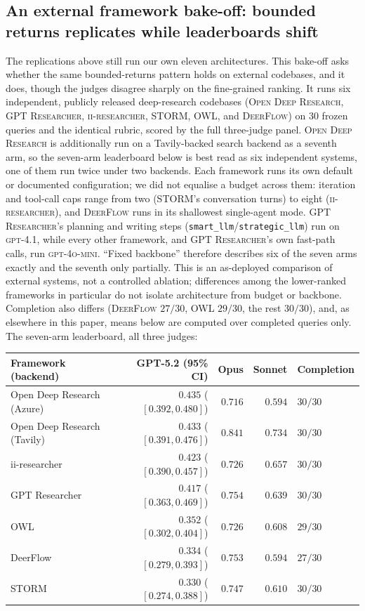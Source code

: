 \documentclass[11pt]{article}
\begin{document}
\subsection{An external framework bake-off: bounded returns replicates while leaderboards shift}\label{sec:bakeoff}
The replications above still run our own eleven architectures. This bake-off asks whether
the same bounded-returns pattern holds on external codebases, and it does,
though the judges disagree sharply on the fine-grained ranking.
It runs six independent, publicly released deep-research codebases (\textsc{Open Deep
Research}, \textsc{GPT Researcher}, \textsc{ii-researcher}, \textsc{STORM},
\textsc{OWL}, and \textsc{DeerFlow}) on $30$ frozen queries and the identical rubric,
scored by the full three-judge panel. \textsc{Open Deep Research} is additionally run on
a Tavily-backed search backend as a seventh arm, so the seven-arm leaderboard below is
best read as six independent systems, one of them run twice under two backends. Each framework runs its own default or
documented configuration; we did not equalise a budget across them: iteration and
tool-call caps range from two (\textsc{STORM}'s conversation turns) to eight
(\textsc{ii-researcher}), and \textsc{DeerFlow} runs in its shallowest single-agent
mode. \textsc{GPT Researcher}'s planning and writing steps
(\texttt{smart\_llm}/\texttt{strategic\_llm}) run on \textsc{gpt-4.1}, while every other
framework, and \textsc{GPT Researcher}'s own fast-path calls, run \textsc{gpt-4o-mini}.
``Fixed backbone'' therefore describes six of the seven arms exactly and the seventh
only partially. This is an as-deployed comparison of external systems, not a controlled
ablation; differences among the lower-ranked frameworks in particular do not isolate
architecture from budget or backbone. Completion also differs
(\textsc{DeerFlow} $27/30$, \textsc{OWL} $29/30$, the rest $30/30$), and, as elsewhere
in this paper, means below are computed over completed queries only. The seven-arm
leaderboard, all three judges:
\begin{center}
\small
\begin{tabular}{lrrrl}
\toprule
Framework (backend) & GPT-5.2 (95\% CI) & Opus & Sonnet & Completion \\
\midrule
Open Deep Research (Azure) & $0.435$ ($[0.392, 0.480]$) & $0.716$ & $0.594$ & $30/30$ \\
Open Deep Research (Tavily) & $0.433$ ($[0.391, 0.476]$) & $0.841$ & $0.734$ & $30/30$ \\
ii-researcher & $0.423$ ($[0.390, 0.457]$) & $0.726$ & $0.657$ & $30/30$ \\
GPT Researcher & $0.417$ ($[0.363, 0.469]$) & $0.754$ & $0.639$ & $30/30$ \\
OWL & $0.352$ ($[0.302, 0.404]$) & $0.726$ & $0.608$ & $29/30$ \\
DeerFlow & $0.334$ ($[0.279, 0.393]$) & $0.753$ & $0.594$ & $27/30$ \\
STORM & $0.330$ ($[0.274, 0.388]$) & $0.747$ & $0.610$ & $30/30$ \\
\bottomrule
\end{tabular}
\end{center}
\end{document}
